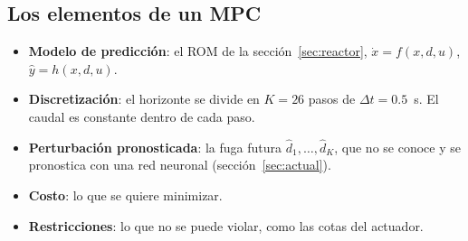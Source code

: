 \subsection{Los elementos de un MPC}
\begin{itemize}
  \item \textbf{Modelo de predicción}: el ROM de la sección~\ref{sec:reactor},
        $\dot x=f(x,d,u)$, $\hat y=h(x,d,u)$.
  \item \textbf{Discretización}: el horizonte se divide en $K=26$ pasos de $\Delta t=0.5$~s.
        El caudal es constante dentro de cada paso.
  \item \textbf{Perturbación pronosticada}: la fuga futura $\hat d_1,\dots,\hat d_K$, que no se
        conoce y se pronostica con una red neuronal (sección~\ref{sec:actual}).
  \item \textbf{Costo}: lo que se quiere minimizar.
  \item \textbf{Restricciones}: lo que no se puede violar, como las cotas del actuador.
\end{itemize}

